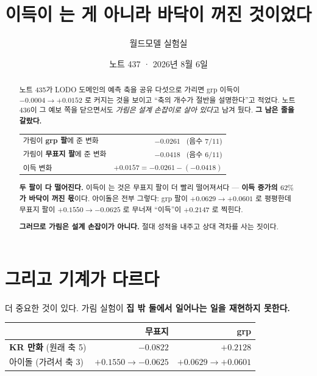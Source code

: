 \documentclass[11pt]{article}
\begin{document}
\title{이득이 는 게 아니라 바닥이 꺼진 것이었다}
\author{월드모델 실험실}
\date{노트 437 · 2026년 8월 6일}
\maketitle

\begin{abstract}
노트 435가 LODO 도메인의 예측 축을 공유 다섯으로 가리면 grp 이득이
$-0.0004 \to +0.0152$ 로 커지는 것을 보이고 ``축의 개수가 절반을 설명한다''고
적었다. 노트 436이 그 예보 쪽을 닫으면서도 \emph{가림은 설계 손잡이로 살아
있다}고 남겨 뒀다. \textbf{그 남은 줄을 갈랐다.}

\begin{center}
\begin{tabular}{lr}
\hline
가림이 \textbf{grp 팔}에 준 변화 & $-0.0261$ \ (음수 $7/11$) \\
가림이 \textbf{무표지 팔}에 준 변화 & $-0.0418$ \ (음수 $6/11$) \\
\hline
이득 변화 & $+0.0157 = -0.0261 - (-0.0418)$ \\
\hline
\end{tabular}
\end{center}

\textbf{두 팔이 다 떨어진다.} 이득이 는 것은 무표지 팔이 더 빨리 떨어져서다
--- \textbf{이득 증가의 $62\%$ 가 바닥이 꺼진 몫}이다. 아이돌은 전부 그렇다:
grp 팔이 $+0.0629 \to +0.0601$ 로 평평한데 무표지 팔이
$+0.1550 \to \mathbf{-0.0625}$ 로 무너져 ``이득''이 $+0.2147$ 로 찍힌다.

\textbf{그러므로 가림은 설계 손잡이가 아니다.} 절대 성적을 내주고 상대 격차를
사는 짓이다.
\end{abstract}

\section{그리고 기계가 다르다}

더 중요한 것이 있다. 가림 실험이 \textbf{집 밖 둘에서 일어나는 일을 재현하지
못한다.}

\begin{center}
\begin{tabular}{lrr}
\hline
 & 무표지 & grp \\
\hline
\textbf{KR 만화} (원래 축 5) & $-0.0822$ & $\mathbf{+0.2128}$ \\
아이돌 (가려서 축 3) & $+0.1550 \to -0.0625$ & $+0.0629 \to +0.0601$ \\
\hline
\end{tabular}
\end{center}
\end{document}
